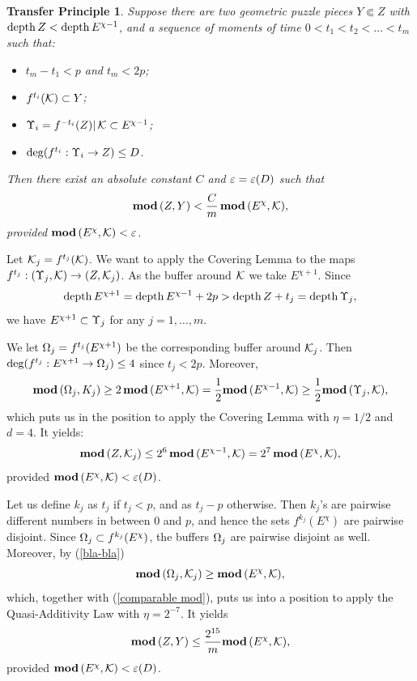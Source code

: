 
\newtheorem*{Transfer}{Transfer Principle}
\begin{Transfer}
  Suppose there are two geometric puzzle pieces 
$Y\Subset Z$ with $\operatorname{depth} Z< \operatorname{depth} E^{\chi-1}$,  %
and a sequence of moments of time $0<t_1<t_2<\dots <t_m$ such that:
\begin{itemize}
\item $t_m-t_1< p$ and $t_m<2p$;
\item   $f^{t_i}({\mathcal K})\subset Y$;
\item ${\Upsilon}_i = f^{-t_i}(Z)|\, {\mathcal K} \subset E^{\chi-1}$;
\item $\deg (f^{t_i}: {\Upsilon}_i\rightarrow Z)\leq D$.
\end{itemize}
  Then there exist an absolute constant $C$ and ${\varepsilon}={\varepsilon}(D)$ such that
$$
   { \mathbf{mod}\, }(Z,Y)<  \frac{C}{m}\, { \mathbf{mod}\, }(E^\chi, {\mathcal K}),
$$
provided ${ \mathbf{mod}\, }(E^\chi, {\mathcal K}) < {\varepsilon}$.  
\end{Transfer}


\begin{pf}
Let ${\mathcal K}_j=f^{t_j}({\mathcal K})$.
We want to apply the Covering Lemma to the maps $f^{t_j}: ({\Upsilon}_j, {\mathcal K}) \rightarrow (Z,{\mathcal K}_j )$. 
As the buffer around ${\mathcal K}$ we take $E^{\chi+1}$.
Since
$$
   \operatorname{depth} E^{\chi+1}= \operatorname{depth} E^{\chi-1}+2p >\operatorname{depth} Z + t_j = \operatorname{depth} {\Upsilon}_j,
$$
we have $E^{\chi+1}\subset {\Upsilon}_j$ for any $j=1,\dots, m$. 

We let ${\Omega}_j= f^{t_j}(E^{\chi+1})$
be the corresponding buffer around ${\mathcal K}_j$.
Then $\deg(f^{t_j}: E^{\chi+1}\rightarrow {\Omega}_j)\leq 4$ since $t_j<2p$.
Moreover, 
\begin{equation}\label{bla-bla}
   { \mathbf{mod}\, }({\Omega}_j, K_j) \geq  2\, { \mathbf{mod}\, } (E^{\chi+1}, {\mathcal K}) = \frac 1{2} { \mathbf{mod}\, } (E^{\chi-1}, {\mathcal K}) 
          \geq \frac 1{2} { \mathbf{mod}\, } ({\Upsilon}_j, {\mathcal K}),    
\end{equation}
which puts us in the position to apply the Covering Lemma with $\eta=1/2$
and $d=4$. It yields: 
\begin{equation}\label{comparable mod}
  { \mathbf{mod}\, }(Z, {\mathcal K}_j) \leq 2^6\, { \mathbf{mod}\, } (E^{\chi-1}, {\mathcal K})= 2^7 \, { \mathbf{mod}\, } (E^\chi, {\mathcal K}),
\end{equation}
provided ${ \mathbf{mod}\, }(E^\chi,{\mathcal K})<{\varepsilon}(D)$. 

Let us define $k_j$ as  $t_j$ if $t_j<p$,
and as $t_j-p$ otherwise. 
Then $k_j$'s are pairwise different numbers in between $0$ and $p$,
and hence the sets  $f^{k_j}(E^\chi)$ are pairwise disjoint.
Since ${\Omega}_j\subset f^{k_j}(E^\chi)$, the buffers ${\Omega}_j$ are pairwise disjoint as well.  
Moreover, by (\ref{bla-bla})
$$
  { \mathbf{mod}\, }({\Omega}_j, {\mathcal K}_j)\geq  { \mathbf{mod}\, }(E^\chi, {\mathcal K}),
$$
which, together with (\ref{comparable mod}), 
puts us into a position to apply the Quasi-Additivity Law with $\eta=2^{-7}$. 
It yields
$$
   { \mathbf{mod}\, }(Z, Y) \leq \frac{2^{15}}{m} { \mathbf{mod}\, }(E^\chi, {\mathcal K}), 
$$
provided ${ \mathbf{mod}\, }(E^\chi,{\mathcal K})<{\varepsilon}(D)$.
\end{pf}








